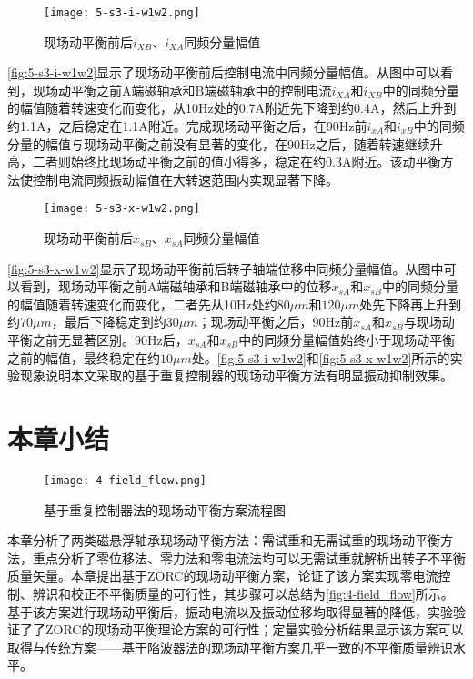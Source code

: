 \documentclass[
  lang=cn,
  degree=master,
  openany,oneside
]{nuaathesis}
\begin{document}
\begin{figure}[h!]
	\texttt{[image: 5-s3-i-w1w2.png]}
	\caption{现场动平衡前后$i_{XB}$、$i_{XA}$同频分量幅值}
	\label{fig:5-s3-i-w1w2}
\end{figure}

\autoref{fig:5-s3-i-w1w2}显示了现场动平衡前后控制电流中同频分量幅值。从图中可以看到，现场动平衡之前A端磁轴承和B端磁轴承中的控制电流$i_{XA}$和$i_{XB}$中的同频分量的幅值随着转速变化而变化，从10Hz处的0.7A附近先下降到约0.4A，然后上升到约1.1A，之后稳定在1.1A附近。完成现场动平衡之后，在90Hz前$i_{xA}$和$i_{xB}$中的同频分量的幅值与现场动平衡之前没有显著的变化，在90Hz之后，随着转速继续升高，二者则始终比现场动平衡之前的值小得多，稳定在约0.3A附近。该动平衡方法使控制电流同频振动幅值在大转速范围内实现显著下降。

\begin{figure}[h!]
	\texttt{[image: 5-s3-x-w1w2.png]}
	\caption{现场动平衡前后$x_{sB}$、$x_{sA}$同频分量幅值}
	\label{fig:5-s3-x-w1w2}
\end{figure}

\autoref{fig:5-s3-x-w1w2}显示了现场动平衡前后转子轴端位移中同频分量幅值。从图中可以看到，现场动平衡之前A端磁轴承和B端磁轴承中的位移$x_{sA}$和$x_{sB}$中的同频分量的幅值随着转速变化而变化，二者先从10Hz处约$80 \mu m$和$120 \mu m$处先下降再上升到约$70\mu m$，最后下降稳定到约$30 \mu m$；现场动平衡之后，90Hz前$x_{sA}$和$x_{sB}$与现场动平衡之前无显著区别。90Hz后，$x_{sA}$和$x_{sB}$中的同频分量幅值始终小于现场动平衡之前的幅值，最终稳定在约$10 \mu m$处。\autoref{fig:5-s3-i-w1w2}和\autoref{fig:5-s3-x-w1w2}所示的实验现象说明本文采取的基于重复控制器的现场动平衡方法有明显振动抑制效果。

\section{本章小结}
\begin{figure}[h!]
	\texttt{[image: 4-field\_flow.png]}
	\caption{基于重复控制器法的现场动平衡方案流程图}
	\label{fig:4-field_flow}
\end{figure}

本章分析了两类磁悬浮轴承现场动平衡方法：需试重和无需试重的现场动平衡方法，重点分析了零位移法、零力法和零电流法均可以无需试重就解析出转子不平衡质量矢量。本章提出基于ZORC的现场动平衡方案，论证了该方案实现零电流控制、辨识和校正不平衡质量的可行性，其步骤可以总结为\autoref{fig:4-field_flow}所示。基于该方案进行现场动平衡后，振动电流以及振动位移均取得显著的降低，实验验证了了ZORC的现场动平衡理论方案的可行性；定量实验分析结果显示该方案可以取得与传统方案——基于陷波器法的现场动平衡方案几乎一致的不平衡质量辨识水平。
\end{document}
